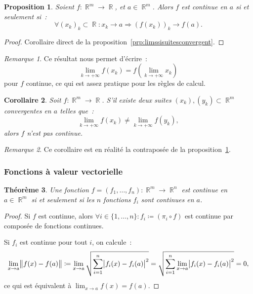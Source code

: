 \documentclass{article}
\DeclareMathOperator{\R}{\mathbb R}
\newtheorem{thm}{Théorème}[section]
\newtheorem{prp}[thm]{Proposition}
\newtheorem{cor}[thm]{Corollaire}
\theoremstyle{definition}
\theoremstyle{remark}
\newtheorem*{rmq}{Remarque}
\begin{document}
		\begin{prp}\label{prp:continuitérmparsuites} Soient $f : \R^m \to \R$, et $a \in \R^m$. Alors $f$ est continue en $a$ si et seulement si~:
		\[\forall (x_k)_k \subset \R : x_k \to a \Rightarrow (f(x_k))_k \to f(a).\]
		\end{prp}

		\begin{proof} Corollaire direct de la proposition~\ref{prp:limssisuitesconvergent}. \end{proof}

		\begin{rmq} Ce résultat nous permet d'écrire~:
		\[\lim_{k \to +\infty}f(x_k) = f\left(\lim_{k \to +\infty}x_k\right)\]
		pour $f$ continue, ce qui est assez pratique pour les règles de calcul.
		\end{rmq}

		\begin{cor} Soit $f : \R^m \to \R$. S'il existe deux suites $(x_k), (y_k) \subset \R^m$ convergentes en $a$ telles que~:
		\[\lim_{k \to +\infty}f(x_k) \neq \lim_{k \to +\infty}f(y_k),\]
		alors $f$ n'est pas continue. \end{cor}

		\begin{rmq} Ce corollaire est en réalité la contraposée de la proposition~\ref{prp:continuitérmparsuites}. \end{rmq}

		\subsubsection{Fonctions à valeur vectorielle}
		\begin{thm} Une fonction $f = (f_1, \dotsc, f_n) : \R^m \to \R^n$ est continue en $a \in \R^m$ si et seulement si les $n$ fonctions $f_i$ sont
		continues en $a$.
		\end{thm}

		\begin{proof} Si $f$ est continue, alors $\forall i \in \{1, \dotsc, n\} : f_i \coloneqq (\pi_i \circ f)$ est continue par composée de fonctions
		continues.

		Si $f_i$ est continue pour tout $i$, on calcule~:
		\[\lim_{x \to a}\norm{f(x)-f(a)} \coloneqq \lim_{x \to a}\sqrt{\sum_{i=1}^n\abs{f_i(x)-f_i(a)}^2}
		= \sqrt {\sum_{i=1}^n\lim_{x \to a}\abs{f_i(x)-f_i(a)}^2} = 0,\]
		ce qui est équivalent à $\lim_{x \to a}f(x) = f(a)$.
		\end{proof}
\end{document}
